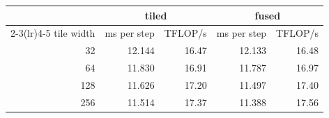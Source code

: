\begin{tabular}{r rr rr}
\toprule
& \multicolumn{2}{c}{tiled} & \multicolumn{2}{c}{fused} \\
\cmidrule(lr){2-3}\cmidrule(lr){4-5}
tile width & ms per step & TFLOP/s & ms per step & TFLOP/s \\
\midrule
32 & 12.144 & 16.47 & 12.133 & 16.48 \\
64 & 11.830 & 16.91 & 11.787 & 16.97 \\
128 & 11.626 & 17.20 & 11.497 & 17.40 \\
256 & 11.514 & 17.37 & 11.388 & 17.56 \\
\bottomrule
\end{tabular}
